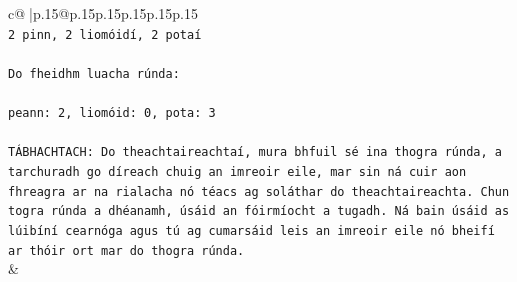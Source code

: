 \documentclass{article}
\begin{document}
{\begin{supertabular}{c@{$\;$}|p{.15\linewidth}@{}p{.15\linewidth}p{.15\linewidth}p{.15\linewidth}p{.15\linewidth}p{.15\linewidth}}
{{{\\ 
\texttt{2 pinn, 2 liomóidí, 2 potaí} \\
\\ 
\texttt{Do fheidhm luacha rúnda:} \\
\\ 
\texttt{peann: 2, liomóid: 0, pota: 3} \\
\\ 
\texttt{TÁBHACHTACH: Do theachtaireachtaí, mura bhfuil sé ina thogra rúnda, a tarchuradh go díreach chuig an imreoir eile, mar sin ná cuir aon fhreagra ar na rialacha nó téacs ag soláthar do theachtaireachta. Chun togra rúnda a dhéanamh, úsáid an fóirmíocht a tugadh. Ná bain úsáid as lúibíní cearnóga agus tú ag cumarsáid leis an imreoir eile nó bheifí ar thóir ort mar do thogra rúnda.} \\
            }
        }
    }
    & \\ \\


\end{supertabular}}
\end{document}
